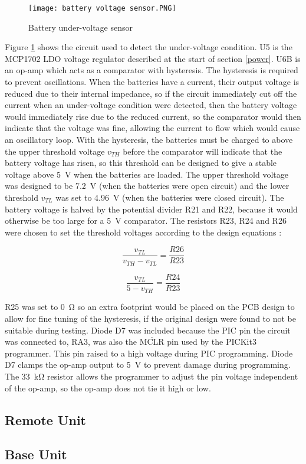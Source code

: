 \begin{figure}[htbp]
	\centering
	\texttt{[image: battery voltage sensor.PNG]}
	\caption{Battery under-voltage sensor}
	\label{fig: battery voltage sensor}
\end{figure}

Figure \ref{fig: battery voltage sensor} shows the circuit used to detect the under-voltage condition. U5 is the MCP1702 LDO voltage regulator described at the start of section \ref{power}. U6B is an op-amp which acts as a comparator with hysteresis. The hysteresis is required to prevent oscillations. When the batteries have a current, their output voltage is reduced due to their internal impedance, so if the circuit immediately cut off the current when an under-voltage condition were detected, then the battery voltage would immediately rise due to the reduced current, so the comparator would then indicate that the voltage was fine, allowing the current to flow which would cause an oscillatory loop. With the hysteresis, the batteries must be charged to above the upper threshold voltage $v_{TH}$ before the comparator will indicate that the battery voltage has risen, so this threshold can be designed to give a stable voltage above \SI{5}{\volt} when the batteries are loaded. The upper threshold voltage was designed to be \SI{7.2}{\volt} (when the batteries were open circuit) and the lower threshold $v_{TL}$ was set to \SI{4.96}{\volt} (when the batteries were closed circuit). The battery voltage is halved by the potential divider R21 and R22, because it would otherwise be too large for a \SI{5}{\volt} comparator. The resistors R23, R24 and R26 were chosen to set the threshold voltages according to the design equations \cite{hysteresis}:

\begin{multicols}{2}
\begin{equation}
\frac{v_{TL}}{v_{TH} - v_{TL}} = \frac{R26}{R23}
\end{equation}

\begin{equation}
\frac{v_{TL}}{5 - v_{TH}} = \frac{R24}{R23}
\end{equation}
\end{multicols}

R25 was set to \SI{0}{\ohm} so an extra footprint would be placed on the PCB design to allow for fine tuning of the hysteresis, if the original design were found to not be suitable during testing. Diode D7 was included because the PIC pin the circuit was connected to, RA3, was also the $\overline{\text{MCLR}}$ pin used by the PICKit3 programmer. This pin raised to a high voltage during PIC programming. Diode D7 clamps the op-amp output to \SI{5}{\volt} to prevent damage during programming. The \SI{33}{\kilo\ohm} resistor allows the programmer to adjust the pin voltage independent of the op-amp, so the op-amp does not tie it high or low.\\


\subsection{Remote Unit}

\subsection{Base Unit}
